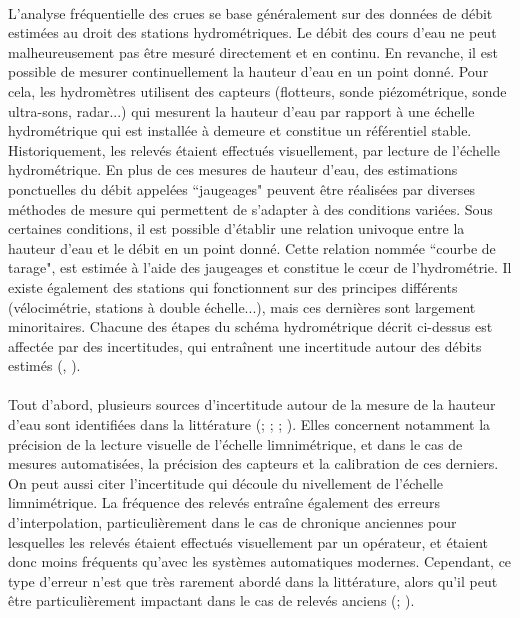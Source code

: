 \documentclass[11pt]{article}
\begin{document}
	\paragraph{} L'analyse fréquentielle des crues se base généralement sur des données de débit estimées au droit des stations hydrométriques. Le débit des cours d'eau ne peut malheureusement pas être mesuré directement et en continu. En revanche, il est possible de mesurer continuellement la hauteur d'eau en un point donné. Pour cela, les hydromètres utilisent des capteurs (flotteurs, sonde piézométrique, sonde ultra-sons, radar...) qui mesurent la hauteur d'eau par rapport à une échelle hydrométrique qui est installée à demeure et constitue un référentiel stable. Historiquement, les relevés étaient effectués visuellement, par lecture de l'échelle hydrométrique. En plus de ces mesures de hauteur d'eau, des estimations ponctuelles du débit appelées ``jaugeages" peuvent être réalisées par diverses méthodes de mesure qui permettent de s'adapter à des conditions variées. Sous certaines conditions, il est possible d'établir une relation univoque entre la hauteur d'eau et le débit en un point donné. Cette relation nommée ``courbe de tarage", est estimée à l'aide des jaugeages et constitue le cœur de l'hydrométrie. Il existe également des stations qui fonctionnent sur des principes différents (vélocimétrie, stations à double échelle...), mais ces dernières sont largement minoritaires. Chacune des étapes du schéma hydrométrique décrit ci-dessus est affectée par des incertitudes, qui entraînent une incertitude autour des débits estimés (\cite{mcmillan_benchmarking_2012}, \cite{puechberty_charte_2017}). 
	
	\paragraph{} Tout d'abord, plusieurs sources d'incertitude autour de la mesure de la hauteur d'eau sont identifiées dans la littérature (\citet{van_der_made_determination_1982}; \citet{petersen-overleir_uncertainty_2005}; \citet{mcmillan_benchmarking_2012}; \citet{horner_impact_2018}). Elles concernent notamment la précision de la lecture visuelle de l'échelle limnimétrique, et dans le cas de mesures automatisées, la précision des capteurs et la calibration de ces derniers. On peut aussi citer l'incertitude qui découle du nivellement de l'échelle limnimétrique. La fréquence des relevés entraîne également des erreurs d'interpolation, particulièrement dans le cas de chronique anciennes pour lesquelles les relevés étaient effectués visuellement par un opérateur, et étaient donc moins fréquents qu'avec les systèmes automatiques modernes. Cependant, ce type d'erreur n'est que très rarement abordé dans la littérature, alors qu'il peut être particulièrement impactant dans le cas de relevés anciens (\citet{hamilton_quantifying_2012}; \citet{kuentz_hydrometrie_2014}).
	
\end{document}
